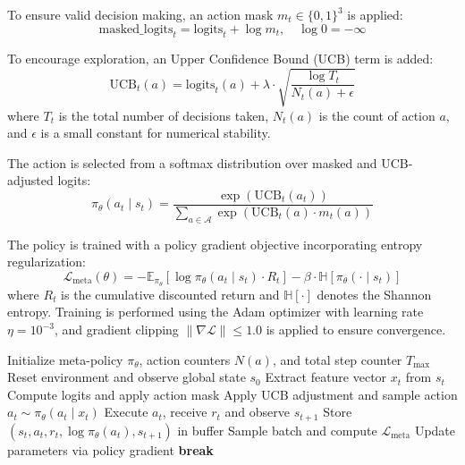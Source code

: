 \documentclass{article}
\begin{document}
To ensure valid decision making, an action mask $m_t \in \{0, 1\}^3$ is applied:
\[
\text{masked\_logits}_t = \text{logits}_t + \log m_t, \quad \log 0 = -\infty
\]

To encourage exploration, an Upper Confidence Bound (UCB) term is added:
\[
\mathrm{UCB}_t(a) = \text{logits}_t(a) + \lambda \cdot \sqrt{\frac{\log T_t}{N_t(a) + \epsilon}}
\]
where $T_t$ is the total number of decisions taken, $N_t(a)$ is the count of action $a$, and $\epsilon$ is a small constant for numerical stability.

The action is selected from a softmax distribution over masked and UCB-adjusted logits:
\[
\pi_\theta(a_t \mid s_t) = \frac{\exp(\mathrm{UCB}_t(a_t))}{\sum_{a \in \mathcal{A}} \exp(\mathrm{UCB}_t(a) \cdot m_t(a))}
\]

The policy is trained with a policy gradient objective incorporating entropy regularization:
\[
\mathcal{L}_{\text{meta}}(\theta) = -\mathbb{E}_{\pi_\theta} [\log \pi_\theta(a_t \mid s_t) \cdot R_t] - \beta \cdot \mathbb{H}[\pi_\theta(\cdot \mid s_t)]
\]
where $R_t$ is the cumulative discounted return and $\mathbb{H}[\cdot]$ denotes the Shannon entropy. Training is performed using the Adam optimizer with learning rate $\eta = 10^{-3}$, and gradient clipping $\|\nabla \mathcal{L}\| \leq 1.0$ is applied to ensure convergence.

\begin{algorithm}[H]
\caption{Meta-Controller Decision and Update Process}
\label{alg:meta_controller}
\begin{algorithmic}[1]
\State Initialize meta-policy $\pi_\theta$, action counters $N(a)$, and total step counter $T_{\max}$
    \State Reset environment and observe global state $s_0$
        \State Extract feature vector $x_t$ from $s_t$
        \State Compute logits and apply action mask
        \State Apply UCB adjustment and sample action $a_t \sim \pi_\theta(a_t \mid x_t)$
        \State Execute $a_t$, receive $r_t$ and observe $s_{t+1}$
        \State Store $(s_t, a_t, r_t, \log \pi_\theta(a_t), s_{t+1})$ in buffer
            \State Sample batch and compute $\mathcal{L}_{\text{meta}}$
            \State Update parameters via policy gradient
        \EndIf
         \textbf{break}
        \EndIf
    \EndFor
\EndFor
\end{algorithmic}
\end{algorithm}
\end{document}

